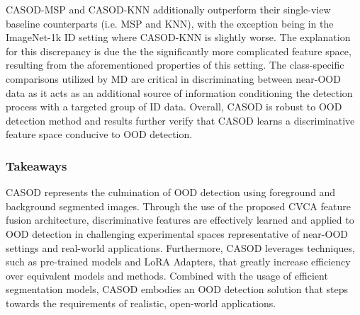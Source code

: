 CASOD-MSP and CASOD-KNN additionally outperform their single-view baseline counterparts (i.e. MSP and KNN), with the exception being in the ImageNet-1k ID setting where CASOD-KNN is slightly worse. The explanation for this discrepancy is due the the significantly more complicated feature space, resulting from the aforementioned properties of this setting. The class-specific comparisons utilized by MD are critical in discriminating between near-OOD data as it acts as an additional source of information conditioning the detection process with a targeted group of ID data. Overall, CASOD is robust to OOD detection method and results further verify that CASOD learns a discriminative feature space conducive to OOD detection.

%
\subsubsection{Takeaways} 
CASOD represents the culmination of OOD detection using foreground and background segmented images. Through the use of the proposed CVCA feature fusion architecture, discriminative features are effectively learned and applied to OOD detection in challenging experimental spaces representative of near-OOD settings and real-world applications. Furthermore, CASOD leverages techniques, such as pre-trained models and LoRA Adapters, that greatly increase efficiency over equivalent models and methods. Combined with the usage of efficient segmentation models, CASOD embodies an OOD detection solution that steps towards the requirements of realistic, open-world applications.

%


